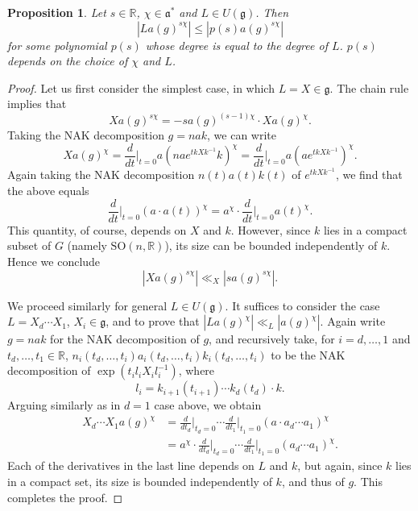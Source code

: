\documentclass[11pt]{amsart}
\def\R{\mathbb{R}}
\newtheorem{proposition}[theorem]{Proposition}
\numberwithin{theorem}{section}
\numberwithin{equation}{section}
\theoremstyle{remark}
\theoremstyle{definition}
\newcommand{\ga}{\mathfrak{a}}
\newcommand{\Lg}{\mathfrak{g}}
\begin{document}
\begin{proposition}\label{prop:uni_gro'}
Let $s \in \R$, $\chi \in \ga^*$ and $L \in U(\Lg)$. Then
\begin{equation*}
|La(g)^{s\chi}| \leq |p(s)a(g)^{s\chi}|
\end{equation*}
for some polynomial $p(s)$ whose degree is equal to the degree of $L$. $p(s)$ depends on the choice of $\chi$ and $L$.
\end{proposition}
\begin{proof}
Let us first consider the simplest case, in which $L=X \in \Lg$. The chain rule implies that
\begin{equation*}
Xa(g)^{s\chi} = -sa(g)^{(s-1)\chi} \cdot Xa(g)^\chi.
\end{equation*}
Taking the NAK decomposition $g=nak$, we can write
\begin{equation*}
Xa(g)^\chi = \frac{d}{dt}\bigg\rvert_{t=0}a( nae^{tkXk^{-1}}k)^\chi = \frac{d}{dt}\bigg\rvert_{t=0}a(ae^{tkXk^{-1}})^\chi.
\end{equation*}
Again taking the NAK decomposition $n(t)a(t)k(t)$ of $e^{tkXk^{-1}}$, we find that the above equals
\begin{equation*}
\frac{d}{dt}\bigg\rvert_{t=0}(a \cdot a(t))^\chi = a^\chi \cdot \frac{d}{dt}\bigg\rvert_{t=0}a(t)^\chi.
\end{equation*}
This quantity, of course, depends on $X$ and $k$. However, since $k$ lies in a compact subset of $G$ (namely $\mathrm{SO}(n,\R)$), its size can be bounded independently of $k$. Hence we conclude
\begin{equation*}
\left|Xa(g)^{s\chi}\right| \ll_X \left| sa(g)^{s\chi} \right|.
\end{equation*}

We proceed similarly for general $L \in U(\Lg)$.
It suffices to consider the case $L = X_d \cdots X_1$, $X_i \in \Lg$, and to prove that $|La(g)^\chi| \ll_L |a(g)^\chi|$. Again write $g=nak$ for the NAK decomposition of $g$, and recursively take, for $i=d, \ldots, 1$ and $t_d, \ldots, t_1 \in \R$, $n_i(t_d, \ldots, t_i)a_i(t_d, \ldots, t_i)k_i(t_d, \ldots, t_i)$ to be the NAK decomposition of $\exp(t_il_iX_il_i^{-1})$, where
\begin{equation*}
l_i = k_{i+1}(t_{i+1}) \cdots k_d(t_d) \cdot k.
\end{equation*}
Arguing similarly as in $d=1$ case above, we obtain
\begin{align*}
X_d \cdots X_1 a(g)^{\chi} &= \frac{d}{dt_d}\bigg\rvert_{t_d=0} \cdots \frac{d}{dt_1}\bigg\rvert_{t_1=0} (a \cdot a_d \cdots a_1)^{\chi} \\
&= a^{\chi} \cdot \frac{d}{dt_d}\bigg\rvert_{t_d=0} \cdots \frac{d}{dt_1}\bigg\rvert_{t_1=0} (a_d \cdots a_1)^{\chi}.
\end{align*}
Each of the derivatives in the last line depends on $L$ and $k$, but again, since $k$ lies in a compact set, its size is bounded independently of $k$, and thus of $g$. This completes the proof.
\end{proof}
\end{document}
